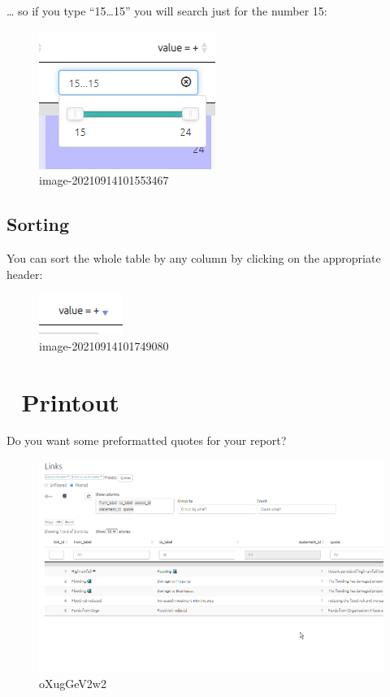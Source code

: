 \documentclass[
]{book}
\begin{document}
\ldots{} so if you type ``15\ldots15'' you will search just for the number 15:

\begin{figure}
\centering
\includegraphics{_assets/image-20210914101553467.png}
\caption{image-20210914101553467}
\end{figure}

\hypertarget{sorting}{%
\subsection{Sorting}\label{sorting}}

You can sort the whole table by any column by clicking on the appropriate header:

\begin{figure}
\centering
\includegraphics{_assets/image-20210914101749080.png}
\caption{image-20210914101749080}
\end{figure}

\hypertarget{printout}{%
\section{🧪 Printout}\label{printout}}

Do you want some preformatted quotes for your report?

\begin{figure}
\centering
\includegraphics{_assets/oXugGeV2w2.gif}
\caption{oXugGeV2w2}
\end{figure}
\end{document}
